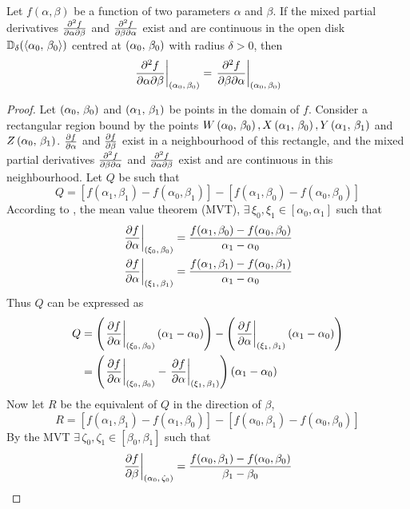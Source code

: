 \begin{lemma}\label{lemma:CLAIRAUT}
	Let $f(\alpha,\beta)$ be a function of two parameters $\alpha$ and $\beta$. If the mixed partial derivatives $\pdv{f}{\alpha}{\beta}$
	and $\pdv{f}{\beta}{\alpha}$ exist and are continuous in the open disk $\mathbb{D}_\delta(\langle\alpha_0,\,\beta_0\rangle)$ centred at
	$\left(\alpha_0,\,\beta_0\right)$ with radius $\delta>0$, then
	$$
		\eval{\pdv{f}{\alpha}{\beta}}_{\point{\alpha_0}{\beta_0}}=\eval{\pdv{f}{\beta}{\alpha}}_{\point{\alpha_0}{\beta_0}}
	$$
	\cite{GARRETT2015377}
	\begin{proof}
		Let $\left(\alpha_0,\,\beta_0\right)$ and $\left(\alpha_1,\,\beta_1\right)$ be points in the domain of $f$. Consider a rectangular region bound by the
		points $W\left(\alpha_0,\,\beta_0\right),X\left(\alpha_1,\,\beta_0\right), Y\left(\alpha_1,\,\beta_1\right)$  and $Z\left(\alpha_0,\,\beta_1\right)$. 
		$\pdv{f}{\alpha}$ and $\pdv{f}{\beta}$ exist in a neighbourhood of this rectangle, and the mixed partial derivatives 
		$\pdv{f}{\beta}{\alpha}$ and $\pdv{f}{\alpha}{\beta}$ exist and are continuous in this neighbourhood. Let $Q$ be such that
		$$
		Q=[f(\alpha_1,\beta_1)-f(\alpha_0,\beta_1)]-[f(\alpha_1,\beta_0)-f(\alpha_0,\beta_0)]
		$$
		According to , the mean value theorem (MVT), $\exists\,\xi_0,\xi_1\in[\alpha_0,\alpha_1]$ such that
		\begin{align*}
			\eval{\pdv{f}{\alpha}}_{\point{\xi_0}{\beta_0}}&=\frac{f(\alpha_1,\beta_0)-f(\alpha_0,\beta_0)}{\alpha_1-\alpha_0}\\
			\eval{\pdv{f}{\alpha}}_{\point{\xi_1}{\beta_1}}&=\frac{f(\alpha_1,\beta_1)-f(\alpha_0,\beta_1)}{\alpha_1-\alpha_0}
		\end{align*}
		Thus $Q$ can be expressed as
		\begin{align*}
			Q&=\left(\eval{\pdv{f}{\alpha}}_{\point{\xi_0}{\beta_0}}\left(\alpha_1-\alpha_0\right)\right)-\left(\eval{\pdv{f}{\alpha}}_{\point{\xi_1}{\beta_1}}\left(\alpha_1-\alpha_0\right)\right)\\
			&=\left(\eval{\pdv{f}{\alpha}}_{\point{\xi_0}{\beta_0}}-\eval{\pdv{f}{\alpha}}_{\point{\xi_1}{\beta_1}}\right)\left(\alpha_1-\alpha_0\right)
		\end{align*}
		Now let $R$ be the equivalent of $Q$ in the direction of $\beta$,
		$$
			R=[f(\alpha_1,\beta_1)-f(\alpha_1,\beta_0)]-[f(\alpha_0,\beta_1)-f(\alpha_0,\beta_0)]
		$$
		By the MVT $\exists\,\zeta_0,\zeta_1\in[\beta_0,\beta_1]$ such that
		\begin{align*}
			\eval{\pdv{f}{\beta}}_{\point{\alpha_0}{\zeta_0}}&=\frac{f(\alpha_0,\beta_1)-f(\alpha_0,\beta_0)}{\beta_1-\beta_0}\\

\end{align*}
\end{proof}
\end{lemma}
